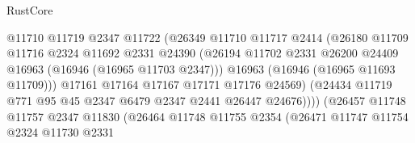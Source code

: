\begin{lexlean}{RustCore}
\begin{coremodule}
                                      @11710
                                      @11719
                                      @2347
                                      @11722
                                      (@26349
                                        @11710
                                        @11717
                                        @2414
                                        (@26180
                                          @11709
                                          @11716
                                          @2324
                                          @11692
                                          @2331
                                          @24390
                                          (@26194
                                            @11702
                                            @2331
                                            @26200
                                            @24409
                                            @16963
                                            (@16946 (@16965 @11703 @2347)))
                                          @16963
                                          (@16946 (@16965 @11693 @11709)))
                                        @17161
                                        @17164
                                        @17167
                                        @17171
                                        @17176
                                        @24569)
                                      (@24434
                                        @11719
                                        @771
                                        @95
                                        @45
                                        @2347
                                        @6479
                                        @2347
                                        @2441
                                        @26447
                                        @24676))))
                                (@26457
                                  @11748
                                  @11757
                                  @2347
                                  @11830
                                  (@26464
                                    @11748
                                    @11755
                                    @2354
                                    (@26471
                                      @11747
                                      @11754
                                      @2324
                                      @11730
                                      @2331

\end{coremodule}
\end{lexlean}
